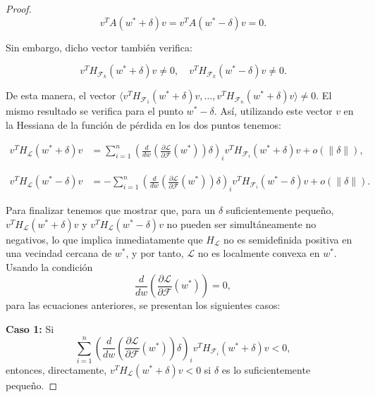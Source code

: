\begin{proof}
    \[
        v^T A( w^* + \delta)  v =  v^T A( w^* - \delta)  v = 0.
    \]

    Sin embargo, dicho vector también verifica:

    \[
        v^T H_{\mathcal{F}_k}( w^* + \delta)  v \neq 0, \quad  v^T H_{\mathcal{F}_k}( w^* - \delta)  v \neq 0.
    \]\newline

    De esta manera, el vector $ \langle v^T H_{\mathcal{F}_1}( w^*+\delta)  v, \dots,  v^T H_{\mathcal{F}_n}( w^*+\delta)  v \rangle \neq 0$. El mismo resultado se verifica para el punto $w^* - \delta$. Así, utilizando este vector $v$ en la Hessiana de la función de pérdida en los dos puntos tenemos:

    \begin{align}
        v^T H_{\mathcal{L}}( w^* + \delta)v &=  
        \sum_{i=1}^{n} \left( \frac{d}{d w} \left( \frac{\partial \mathcal{L}}{\partial \mathcal{F}}( w^*) \right) \delta \right)_i v^T H_{\mathcal{F}_i}( w^* + \delta) v + o(\|\delta\|),
    \end{align}

    \begin{align}
        v^T H_{\mathcal{L}}( w^* - \delta)v &=  
        - \sum_{i=1}^{n} \left( \frac{d}{d w} \left( \frac{\partial \mathcal{L}}{\partial \mathcal{F}}( w^*) \right) \delta \right)_i v^T H_{\mathcal{F}_i}( w^* - \delta) v + o(\|\delta\|).
    \end{align}

    Para finalizar tenemos que mostrar que, para un $\delta$ suficientemente pequeño, $v^T H_{\mathcal{L}}(w^* + \delta) v$ y $v^T H_{\mathcal{L}}(w^* - \delta) v$ no pueden ser simultáneamente no negativos, lo que implica inmediatamente que $H_{\mathcal{L}}$ no es semidefinida positiva en una vecindad cercana de $w^*$, y por tanto, $\mathcal{L}$ no es localmente convexa en $w^*$. Usando la condición 
    \[
    \frac{d}{dw} (\frac{\partial \mathcal{L}}{\partial \mathcal{F}}(w^*)) = 0,
    \]
    para las ecuaciones anteriores, se presentan los siguientes casos:\newline

    \textbf{Caso 1:} Si 
    \[
    \sum_{i=1}^{n} \left( \frac{d}{dw} (\frac{\partial \mathcal{L}}{\partial \mathcal{F}}(w^*))\delta \right)_i v^T H_{\mathcal{F}_i}(w^* + \delta) v < 0,
    \]
    entonces, directamente, $v^T H_{\mathcal{L}}(w^* + \delta) v < 0$ si $\delta$ es lo suficientemente pequeño.\newline


\end{proof}
